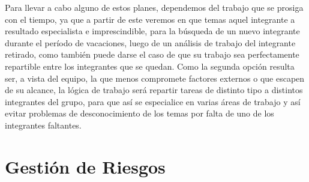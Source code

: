 \documentclass[letterpaper,spanish,10pt]{article}
\begin{document}
\begin{itemize}
\begin{itemize}
		Para llevar a cabo alguno de estos planes, dependemos del trabajo que se prosiga con el tiempo, ya que a partir de este veremos en que temas aquel integrante a resultado especialista e imprescindible, para la b\'usqueda de un nuevo integrante durante el per\'iodo de vacaciones, luego de un an\'alisis de trabajo del integrante retirado, como tambi\'en puede darse el caso de que su trabajo sea perfectamente repartible entre los integrantes que se quedan. Como la segunda opci\'on resulta ser, a vista del equipo, la que menos compromete factores externos o que escapen de su alcance, la l\'ogica de trabajo ser\'a repartir tareas de distinto tipo a distintos integrantes del grupo, para que as\'i se especialice en varias \'areas de trabajo y as\'i evitar problemas de desconocimiento de los temas por falta de uno de los integrantes faltantes.
		\end{itemize}



\end{itemize}



\newpage
\section{Gesti\'on de Riesgos} %
\end{document}
